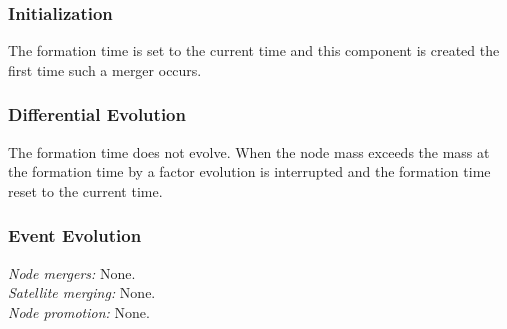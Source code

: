 \subsubsection{Initialization}

The formation time is set to the current time and this \gls{component} is created the first time such a merger occurs.

\subsubsection{Differential Evolution}

The formation time does not evolve. When the \gls{node} mass exceeds the mass at the formation time by a factor {\normalfont \ttfamily [haloReformationMassFactor]} evolution is interrupted and the formation time reset to the current time.

\subsubsection{Event Evolution}

\noindent\emph{Node mergers:} None.\\

\noindent\emph{Satellite merging:} None.\\

\noindent\emph{Node promotion:} None.\\

